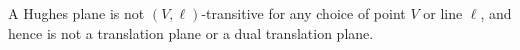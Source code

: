 A Hughes plane is not $(V,\ell)$-transitive for any choice of point $V$ or line $\ell$, and hence is not a translation plane or a dual translation plane.
